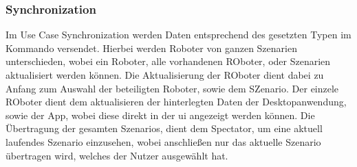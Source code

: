 \newpage
\subsubsection{Synchronization}

Im Use Case Synchronization werden Daten entsprechend des gesetzten Typen im Kommando versendet. Hierbei werden Roboter von ganzen Szenarien unterschieden, wobei ein Roboter, alle vorhandenen ROboter, oder Szenarien aktualisiert werden können. Die Aktualisierung der ROboter dient dabei zu Anfang zum Auswahl der beteiligten Roboter, sowie dem SZenario. Der einzele ROboter dient dem aktualisieren der hinterlegten Daten der Desktopanwendung, sowie der App, wobei diese direkt in der \gls{ui} angezeigt werden können. Die Übertragung der gesamten Szenarios, dient dem Spectator, um eine aktuell laufendes Szenario einzusehen, wobei anschließen nur das aktuelle Szenario übertragen wird, welches der Nutzer ausgewählt hat.

